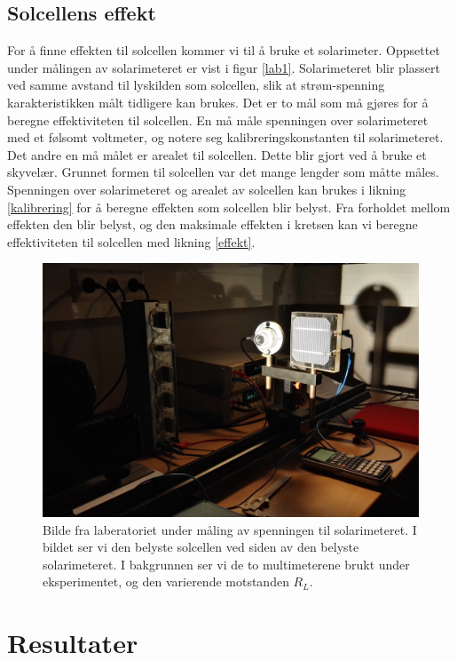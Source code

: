 \documentclass[%
 reprint,
 amsmath,amssymb,
 aps,
 norsk,
 booktabs
]{revtex4-1}
\begin{document}
\subsection{Solcellens effekt}
For å finne effekten til solcellen kommer vi til å bruke et solarimeter. Oppsettet under målingen av solarimeteret er vist i figur \vref{lab1}. Solarimeteret blir plassert ved samme avstand til lyskilden som solcellen, slik at strøm-spenning karakteristikken målt tidligere kan brukes. Det er to mål som må gjøres for å beregne effektiviteten til solcellen. En må måle spenningen over solarimeteret med et følsomt voltmeter, og notere seg kalibreringskonstanten til solarimeteret. Det andre en må målet er arealet til solcellen. Dette blir gjort ved å bruke et skyvelær. Grunnet formen til solcellen var det mange lengder som måtte måles. Spenningen over solarimeteret og arealet av solcellen kan brukes i likning \eqref{kalibrering} for å beregne effekten som solcellen blir belyst. Fra forholdet mellom effekten den blir belyst, og den maksimale effekten i kretsen kan vi beregne effektiviteten til solcellen med likning \eqref{effekt}.
\begin{figure}[h!]
  \centering
  \includegraphics[scale=0.065]{lab1.jpg}
  \caption{Bilde fra laberatoriet under måling av spenningen til solarimeteret. I bildet ser vi den belyste solcellen ved siden av den belyste solarimeteret. I bakgrunnen ser vi de to multimeterene brukt under eksperimentet, og den varierende motstanden $R_L$.}
  \label{lab1}
\end{figure}
\section{Resultater}
\end{document}
